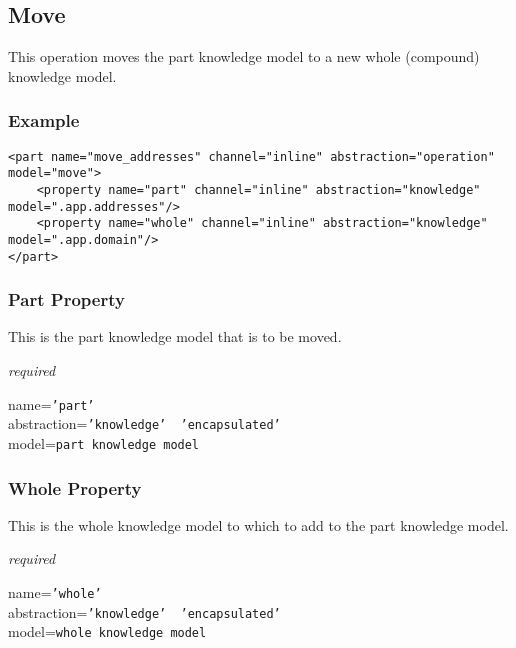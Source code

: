 %
%
%
%
%
%

\subsection{Move}
\label{move_heading}

This operation moves the part knowledge model to a new whole (compound)
knowledge model.

\subsubsection{Example}

\begin{scriptsize}
    \begin{verbatim}
<part name="move_addresses" channel="inline" abstraction="operation" model="move">
    <property name="part" channel="inline" abstraction="knowledge" model=".app.addresses"/>
    <property name="whole" channel="inline" abstraction="knowledge" model=".app.domain"/>
</part>
    \end{verbatim}
\end{scriptsize}

\subsubsection{Part Property}

This is the part knowledge model that is to be moved.

\emph{required}

name=\texttt{'part'}\\
abstraction=\texttt{'knowledge' \vline\ 'encapsulated'}\\
model=\texttt{part knowledge model}

\subsubsection{Whole Property}

This is the whole knowledge model to which to add to the part knowledge model.

\emph{required}

name=\texttt{'whole'}\\
abstraction=\texttt{'knowledge' \vline\ 'encapsulated'}\\
model=\texttt{whole knowledge model}
